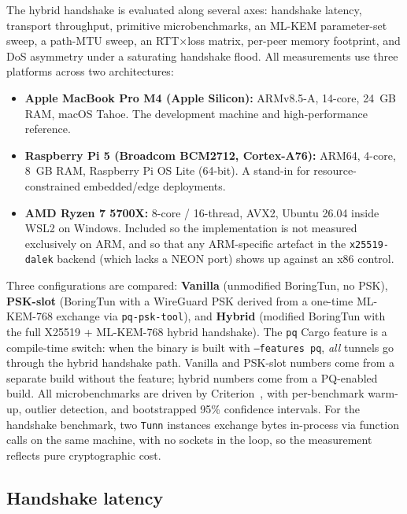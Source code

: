 \documentclass[11pt,a4paper]{article}
\begin{document}
The hybrid handshake is evaluated along several axes: handshake latency, transport throughput, primitive microbenchmarks, an ML-KEM parameter-set sweep, a path-MTU sweep, an RTT$\times$loss matrix, per-peer memory footprint, and DoS asymmetry under a saturating handshake flood. All measurements use three platforms across two architectures:

\begin{itemize}[leftmargin=*,topsep=2pt,itemsep=2pt]
    \item \textbf{Apple MacBook Pro M4 (Apple Silicon):} ARMv8.5-A, 14-core, 24~GB RAM, macOS Tahoe. The development machine and high-performance reference.
    \item \textbf{Raspberry Pi 5 (Broadcom BCM2712, Cortex-A76):} ARM64, 4-core, 8~GB RAM, Raspberry Pi OS Lite (64-bit). A stand-in for resource-constrained embedded/edge deployments.
    \item \textbf{AMD Ryzen 7 5700X:} 8-core / 16-thread, AVX2, Ubuntu 26.04 inside WSL2 on Windows. Included so the implementation is not measured exclusively on ARM, and so that any ARM-specific artefact in the \texttt{x25519-dalek} backend (which lacks a NEON port) shows up against an x86 control.
\end{itemize}

Three configurations are compared: \textbf{Vanilla} (unmodified BoringTun, no PSK), \textbf{PSK-slot} (BoringTun with a WireGuard PSK derived from a one-time ML-KEM-768 exchange via \texttt{pq-psk-tool}), and \textbf{Hybrid} (modified BoringTun with the full X25519 + ML-KEM-768 hybrid handshake). The \texttt{pq} Cargo feature is a compile-time switch: when the binary is built with \texttt{--features pq}, \emph{all} tunnels go through the hybrid handshake path. Vanilla and PSK-slot numbers come from a separate build without the feature; hybrid numbers come from a PQ-enabled build. All microbenchmarks are driven by Criterion~\cite{criterion}, with per-benchmark warm-up, outlier detection, and bootstrapped 95\% confidence intervals. For the handshake benchmark, two \texttt{Tunn} instances exchange bytes in-process via function calls on the same machine, with no sockets in the loop, so the measurement reflects pure cryptographic cost.

\subsection{Handshake latency}
\label{sec:eval_handshake}
\end{document}

